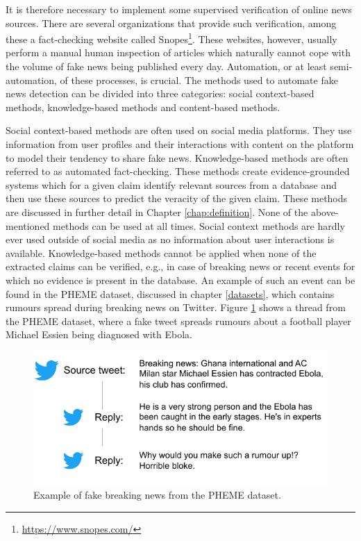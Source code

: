 It is therefore necessary to implement some supervised verification of online news sources. There are several organizations that provide such verification, among these a fact-checking website called Snopes\footnote{\url{https://www.snopes.com/}}. These websites, however, usually perform a manual human inspection of articles which naturally cannot cope with the volume of fake news being published every day. Automation, or at least semi-automation, of these processes, is crucial. The methods used to automate fake news detection can be divided into three categories: social context-based methods, knowledge-based methods and content-based methods.

Social context-based methods are often used on social media platforms. They use information from user profiles and their interactions with content on the platform to model their tendency to share fake news. Knowledge-based methods are often referred to as automated fact-checking. These methods create evidence-grounded systems which for a given claim identify relevant sources from a database and then use these sources to predict the veracity of the given claim. These methods are discussed in further detail in Chapter \ref{chap:definition}.
None of the above-mentioned methods can be used at all times. Social context methods are hardly ever used outside of social media as no information about user interactions is available. Knowledge-based methods cannot be applied when none of the extracted claims can be verified, e.g., in case of breaking news or recent events for which no evidence is present in the database. An example of such an event can be found in the PHEME dataset, discussed in chapter \ref{datasets}, which contains rumours spread during breaking news on Twitter. Figure \ref{fig:pheme_essien} shows a thread from the PHEME dataset, where a fake tweet spreads rumours about a football player Michael Essien being diagnosed with Ebola.

\begin{figure}[h]
    \centering
    \includegraphics[scale=0.9]{obrazky-figures/pheme_essien.pdf}
    \caption{Example of fake breaking news from the PHEME dataset.}
    \label{fig:pheme_essien}
\end{figure}

